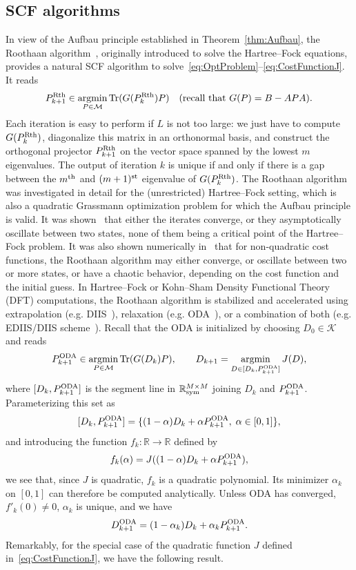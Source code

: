 \documentclass{article}
\def\R{\mathbb R}
\newcommand{\tr}{{\rm Tr}}
\newcommand{\1}{{\mathds 1}}
\begin{document}
\subsection{SCF algorithms}
\label{sec:SCF}

In view of the Aufbau principle established in Theorem~\ref{thm:Aufbau}, the Roothaan algorithm~\cite{Roothaan1951}, originally introduced to solve the Hartree--Fock equations, provides a natural SCF algorithm to solve~\eqref{eq:OptProblem}--\eqref{eq:CostFunctionJ}. It reads
\begin{equation}
P_{k+1}^{\rm Rth} \in \mathop{\rm argmin}_{P \in \mathcal M} \tr(G(P_k^{\rm Rth})P) \quad (\mbox{recall that } G(P) = B - A P A). \label{eq:Roothaan}
\end{equation}
Each iteration is easy to perform if $L$ is not too large: we just have to compute $G(P_k^{\rm Rth})$, diagonalize this matrix in an orthonormal basis, and construct the orthogonal projector $P_{k+1}^{\rm Rth}$ on the vector space spanned by the lowest $m$ eigenvalues. The output of iteration $k$ is unique if and only if there is a gap between the $m^{\rm th}$ and $(m+1)^{\rm st}$ eigenvalue of $G(P_k^{\rm Rth})$. The Roothaan algorithm was investigated in detail for the (unrestricted) Hartree--Fock setting, which is also a quadratic Grassmann optimization problem for which the Aufbau principle is valid. It was shown~\cite{cances2000c,levitt2012b} that either the iterates converge, or they asymptotically oscillate between two states, none of them being a critical point of the Hartree--Fock problem. It was also shown numerically in~\cite{Cances_2021} that for non-quadratic cost functions, the Roothaan algorithm may either converge, or oscillate between two or more states, or have a chaotic behavior, depending on the cost function and the initial guess. In Hartree--Fock or Kohn--Sham Density Functional Theory (DFT) computations, the Roothaan algorithm is stabilized and accelerated using extrapolation (e.g. DIIS~\cite{Pulay1980,Pulay1982}), relaxation (e.g. ODA~\cite{cances2000b}), or a combination of both (e.g. EDIIS/DIIS scheme~\cite{Kudin2002}). Recall that the ODA is initialized by choosing $D_0 \in \mathcal K$ and reads
\begin{equation}
P_{k+1}^{\rm ODA} \in \mathop{\rm argmin}_{P \in \mathcal M} \tr(G(D_k)P), \qquad D_{k+1}=\mathop{\rm argmin}_{D \in [D_k,P_{k+1}^{\rm ODA}]} J(D), \label{eq:ODA}
\end{equation}
where $[D_k,P_{k+1}^{\rm ODA}]$ is the segment line in $\R^{M \times M}_{\rm sym}$ joining $D_k$ and $P_{k+1}^{\rm ODA}$. Parameterizing this set as
$$
[D_k,P_{k+1}^{\rm ODA}]= \{  (1-\alpha) D_{k}+\alpha P_{k+1}^{\rm ODA}, \; \alpha \in [0,1] \},
$$
and introducing the function $f_k:\R \to \R$ defined by 
$$
f_{k}(\alpha) = J((1-\alpha) D_{k}+\alpha P_{k+1}^{\rm ODA}),
$$
we see that, since $J$ is quadratic, $f_k$ is a quadratic polynomial. Its minimizer $\alpha_k$ on $[0,1]$ can therefore be computed analytically. Unless ODA has converged, $f'_k(0) \neq 0$, $\alpha_k$ is unique, and we have
$$
D_{k+1}^{\rm ODA}=(1-\alpha_k) D_{k}+\alpha_k P_{k+1}^{\rm ODA}.
$$
Remarkably, for the special case of the quadratic function $J$ defined in~\eqref{eq:CostFunctionJ}, we have the following result.
\end{document}
